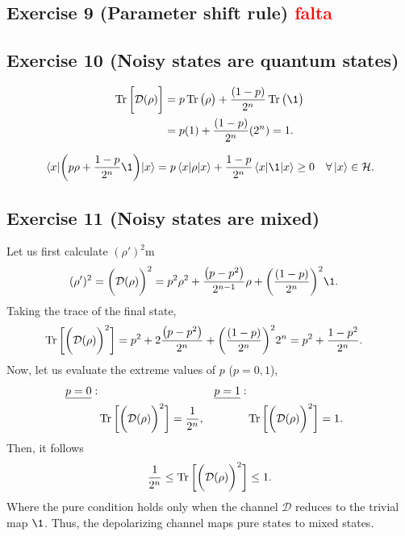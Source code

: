 \subsection{Exercise 9 (Parameter shift rule) \textcolor{red}{falta}}


\subsection{Exercise 10 (Noisy states are quantum states)}
\begin{align}
\Tr\bigg[\mathcal{D}(\rho) \bigg]&=p\Tr \big( \rho \big)+
	\frac{\qty(1-p)}{2^n}\Tr \big( \1 \big)\\
&=p\qty(1)+\frac{\qty(1-p)}{2^n}\qty(2^n)=1.
\end{align}

\begin{align}
\matrixel{x}{\bigg( p\rho+\frac{1-p}{2^n}\1\bigg)}{x}=p\matrixel{x}{\rho}{x}+
	\frac{1-p}{2^n}\matrixel{x}{\1}{x}\geq 0\quad \forall \ket{x}\in \mathcal{H}.
\end{align}

\subsection{Exercise 11 (Noisy states are mixed)}
Let us first calculate $(\rho')^2$m
\begin{align}
(\rho')^2=\bigg( \mathcal{D}(\rho) \bigg)^2&=
		p^2\rho^2+\frac{\qty(p-p^2)}{2^{n-1}}\rho+\qty(\frac{\qty(1-p)}{2^n})^2\1.
\end{align}
Taking the trace of the final state, 
\begin{align}
\Tr\bigg[\bigg( \mathcal{D}(\rho) \bigg)^2\bigg]&=
	p^2+2\frac{\qty(p-p^2)}{2^{n}}+\qty(\frac{\qty(1-p)}{2^n})^22^n=
		p^2+\frac{1-p^2}{2^n}.
\end{align}
Now, let us evaluate the extreme values of $p$ ($p=0,1$),
\begin{align}
\underline{p=0}: & \quad& \underline{p=1}: & \quad &\nonumber\\
& \Tr\bigg[\bigg( \mathcal{D}(\rho) \bigg)^2\bigg]=\frac{1}{2^n}, &
& \Tr\bigg[\bigg( \mathcal{D}(\rho) \bigg)^2\bigg]=1.
\end{align}
Then, it follows 
\begin{align}
\frac{1}{2^n}\leq \Tr\bigg[\bigg( \mathcal{D}(\rho) \bigg)^2\bigg]\leq 1.
\end{align}
Where the pure condition holds only when the channel $\mathcal{D}$ reduces 
to the trivial map $\1$. Thus, the depolarizing channel maps pure states to 
mixed states.
